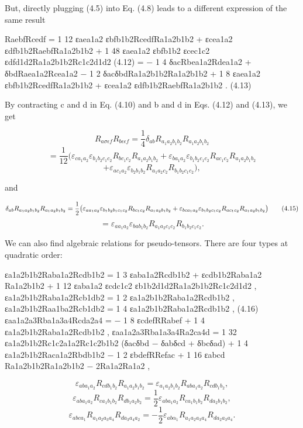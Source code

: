 \documentclass{article}
\begin{document}
But, directly plugging (4.5) into Eq. (4.8) leads to a different expression of the same result

RaebfRcedf = 1 12 εaea1a2 εbfb1b2RcedfRa1a2b1b2 + εcea1a2 εdfb1b2RaebfRa1a2b1b2 + 1 48 εaea1a2 εbfb1b2 εcec1c2 εdfd1d2Ra1a2b1b2Rc1c2d1d2 (4.12) = − 1 4 δacRbea1a2Rdea1a2 + δbdRaea1a2Rcea1a2 − 1 2 δacδbdRa1a2b1b2Ra1a2b1b2 + 1 8 εaea1a2 εbfb1b2RcedfRa1a2b1b2 + εcea1a2 εdfb1b2RaebfRa1a2b1b2 . (4.13)

By contracting c and d in Eq. (4.10) and b and d in Eqs. (4.12) and (4.13), we get

$$R_{a\sigma\epsilon f}R_{b\epsilon\epsilon f}=\frac{1}{4}\delta_{ab}R_{a_{1}a_{2}b_{1}b_{2}}R_{a_{1}a_{2}b_{1}b_{2}}\tag{4.14}$$ $$=\frac{1}{12}(\varepsilon_{ca_{1}a_{2}}\varepsilon_{b_{1}b_{2}c_{1}c_{2}}R_{bc_{1}c_{2}}R_{a_{1}a_{2}b_{1}b_{2}}+\varepsilon_{ba_{1}a_{2}}\varepsilon_{b_{1}b_{2}c_{1}c_{2}}R_{ac_{1}c_{2}}R_{a_{1}a_{2}b_{1}b_{2}}$$ $$+\varepsilon_{ac_{1}a_{2}}\varepsilon_{b_{2}b_{1}b_{2}}R_{a_{1}a_{2}c_{2}}R_{b_{1}b_{2}c_{1}c_{2}}),$$

and

$$\delta_{ab}R_{a_{1}a_{2}b_{1}b_{2}}R_{a_{1}a_{2}b_{1}b_{2}}=\frac{1}{2}\big{(}\varepsilon_{aa_{1}a_{2}}\varepsilon_{b_{1}b_{2}b_{1}c_{1}c_{2}}R_{bc_{1}c_{2}}R_{a_{1}a_{2}b_{1}b_{2}}+\varepsilon_{bca_{1}a_{2}}\varepsilon_{b_{1}b_{2}c_{1}c_{2}}R_{ac_{1}c_{2}}R_{a_{1}a_{2}b_{1}b_{2}}\big{)}\tag{4.15}$$ $$=\varepsilon_{aa_{1}a_{2}}\varepsilon_{bab_{1}b_{2}}R_{a_{1}a_{2}c_{1}c_{2}}R_{b_{1}b_{2}c_{1}c_{2}}.$$

We can also find algebraic relations for pseudo-tensors. There are four types at quadratic order:

εa1a2b1b2Raba1a2Rcdb1b2 = 1 3 εaba1a2Rcdb1b2 + εcdb1b2Raba1a2 Ra1a2b1b2 + 1 12 εaba1a2 εcdc1c2 εb1b2d1d2Ra1a2b1b2Rc1c2d1d2 , εa1a2b1b2Raba1a2Rcb1db2 = 1 2 εa1a2b1b2Raba1a2Rcdb1b2 , εa1a2b1b2Raa1ba2Rcb1db2 = 1 4 εa1a2b1b2Raba1a2Rcdb1b2 , (4.16) εaa1a2a3Rba1a3a4Rcda2a4 = − 1 8 εcdefRRabef + 1 4 εa1a2b1b2Raba1a2Rcdb1b2 , εaa1a2a3Rba1a3a4Ra2ca4d = 1 32 εa1a2b1b2Rc1c2a1a2Rc1c2b1b2 (δacδbd − δabδcd + δbcδad) + 1 4 εa1a2b1b2Raca1a2Rbdb1b2 − 1 2 εbdefRRefac + 1 16 εabcd Ra1a2b1b2Ra1a2b1b2 − 2Ra1a2Ra1a2 ,

$$\varepsilon_{aba_{1}a_{2}}R_{cdb_{1}b_{2}}R_{a_{1}a_{2}b_{1}b_{2}}=\varepsilon_{a_{1}a_{2}b_{1}b_{2}}R_{aba_{1}a_{2}}R_{cdb_{1}b_{2}},$$ $$\varepsilon_{aba_{1}a_{2}}R_{ca_{1}b_{1}b_{2}}R_{db_{1}a_{2}b_{2}}=\frac{1}{2}\varepsilon_{aba_{1}a_{2}}R_{ca_{1}b_{1}b_{2}}R_{da_{2}b_{1}b_{2}},\tag{4.17}$$ $$\varepsilon_{abca_{1}}R_{a_{1}a_{2}a_{3}a_{4}}R_{da_{3}a_{4}a_{2}}=-\frac{1}{2}\varepsilon_{ab\alpha_{1}}R_{a_{1}a_{2}a_{3}a_{4}}R_{da_{2}a_{3}a_{4}}.$$
\end{document}
